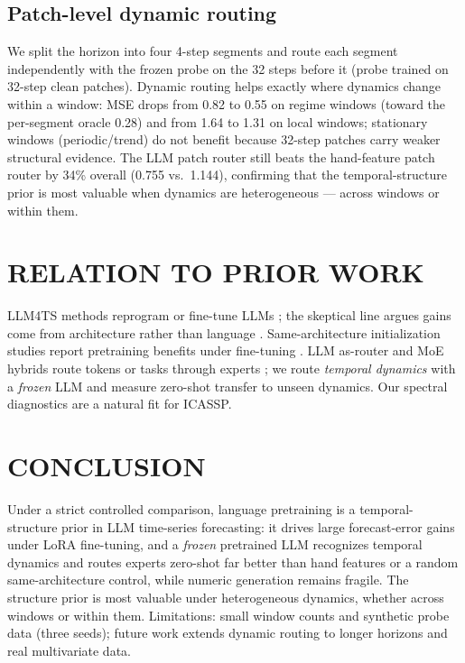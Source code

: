 \documentclass{article}
\begin{document}
\subsection{Patch-level dynamic routing}\label{sec:e6}
We split the horizon into four 4-step segments and route each segment
independently with the frozen probe on the 32 steps before it (probe trained on
32-step clean patches).  Dynamic routing helps exactly where dynamics change
within a window: MSE drops from 0.82 to 0.55 on regime windows (toward the
per-segment oracle 0.28) and from 1.64 to 1.31 on local windows; stationary
windows (periodic/trend) do not benefit because 32-step patches carry weaker
structural evidence.  The LLM patch router still beats the hand-feature patch
router by 34\% overall (0.755 vs.\ 1.144), confirming that the temporal-structure
prior is most valuable when dynamics are heterogeneous --- across windows or
within them.

\section{RELATION TO PRIOR WORK}
\label{sec:related}
LLM4TS methods reprogram or fine-tune LLMs \cite{timellm,autotimes,prdts}; the
skeptical line argues gains come from architecture rather than language
\cite{tan2024useful}.  Same-architecture initialization studies report
pretraining benefits under fine-tuning \cite{randominit,crossmodalm}.  LLM
as-router and MoE hybrids route tokens or tasks through experts
\cite{lego,fmllm,dmoe}; we route \emph{temporal dynamics} with a \emph{frozen}
LLM and measure zero-shot transfer to unseen dynamics.  Our spectral
diagnostics are a natural fit for ICASSP.

\section{CONCLUSION}
\label{sec:conclusion}
Under a strict controlled comparison, language pretraining is a
temporal-structure prior in LLM time-series forecasting: it drives large
forecast-error gains under LoRA fine-tuning, and a \emph{frozen} pretrained LLM
recognizes temporal dynamics and routes experts zero-shot far better than hand
features or a random same-architecture control, while numeric generation
remains fragile.  The structure prior is most valuable under heterogeneous
dynamics, whether across windows or within them.  Limitations: small window
counts and synthetic probe data (three seeds); future work extends dynamic
routing to longer horizons and real multivariate data.
\end{document}
